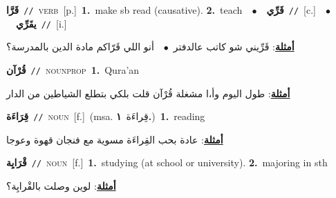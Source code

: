 \documentclass[10pt,a4paper,twoside]{article} %
\begin{document}
\begin{multicols}{2}
{\setlength\topsep{0pt}\textbf{\foreignlanguage{arabic}{قَرَّا}}\ {\color{gray}\texttt{//}\color{black}}\ \textsc{verb}\ [p.]\ \textbf{1.}~make sb read (causative).  \textbf{2.}~teach\ \ $\bullet$\ \ \setlength\topsep{0pt}\textbf{\foreignlanguage{arabic}{قَرِّي}}\ {\color{gray}\texttt{//}\color{black}}\ [c.]\ \ $\bullet$\ \ \setlength\topsep{0pt}\textbf{\foreignlanguage{arabic}{يقَرِّي}}\ {\color{gray}\texttt{//}\color{black}}\ [i.]\  \begin{flushright}\color{gray}\foreignlanguage{arabic}{\textbf{\underline{\foreignlanguage{arabic}{أمثلة}}}: قَرِّيني شو كاتب عالدفتر\ $\bullet$\ \  أنو اللي قَرّاكم مادة الدين بالمدرسة؟}\end{flushright}\color{black}} \vspace{2mm}

{\setlength\topsep{0pt}\textbf{\foreignlanguage{arabic}{قُرْآن}}\ {\color{gray}\texttt{//}\color{black}}\ \textsc{noun\textunderscore prop}\ \textbf{1.}~Qura'an\  \begin{flushright}\color{gray}\foreignlanguage{arabic}{\textbf{\underline{\foreignlanguage{arabic}{أمثلة}}}: طول اليوم وأ،ا مشغلة قُرْآن قلت بلكي بتطلع الشياطين من الدار}\end{flushright}\color{black}} \vspace{2mm}

{\setlength\topsep{0pt}\textbf{\foreignlanguage{arabic}{قِرَاءَة}}\ {\color{gray}\texttt{//}\color{black}}\ \textsc{noun}\ [f.]\ \color{gray}(msa. \foreignlanguage{arabic}{قِراءَة}~\foreignlanguage{arabic}{\textbf{١.}})\color{black}\ \textbf{1.}~reading\  \begin{flushright}\color{gray}\foreignlanguage{arabic}{\textbf{\underline{\foreignlanguage{arabic}{أمثلة}}}: عادة بحب القِراءَة مسوية مع فنجان قهوة وعوجا}\end{flushright}\color{black}} \vspace{2mm}

{\setlength\topsep{0pt}\textbf{\foreignlanguage{arabic}{قْرَايِة}}\ {\color{gray}\texttt{//}\color{black}}\ \textsc{noun}\ [f.]\ \textbf{1.}~studying (at school or university).  \textbf{2.}~majoring in sth\  \begin{flushright}\color{gray}\foreignlanguage{arabic}{\textbf{\underline{\foreignlanguage{arabic}{أمثلة}}}: لوين وصلت بالقْرايِة؟}\end{flushright}\color{black}} \vspace{2mm}


\end{multicols}
\end{document}
